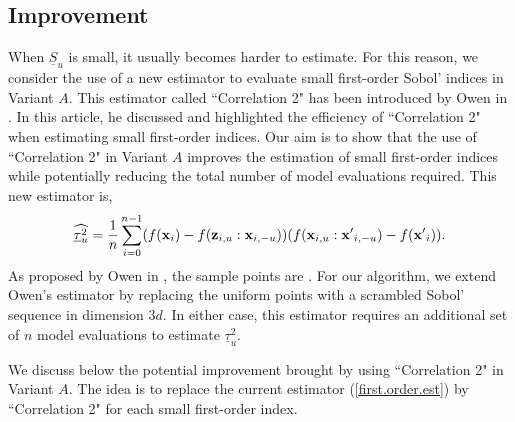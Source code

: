 \subsection{Improvement}
\label{sec:4.2}

When $\underline{S}_u$ is small, it usually becomes harder to estimate. For this reason, we consider the use of a new estimator to evaluate small first-order Sobol' indices in Variant $A$. This estimator called ``Correlation 2" has been introduced by Owen in \cite{Owen}. In this article, he discussed and highlighted the efficiency of ``Correlation 2" when estimating small first-order indices. Our aim is to show that the use of ``Correlation 2" in Variant $A$ improves the estimation of small first-order indices while potentially reducing the total number of model evaluations required. This new estimator is,
\begin{equation*}
\widehat{\underline{\tau}_u^2} = \frac{1}{n} \sum \limits_{i=0}^{n-1} (f(\boldsymbol{\mathbf{x}}_i)-f({\boldsymbol{\mathbf{z}}}_{i,u}:{\boldsymbol{\mathbf{x}}}_{i,-u}))(f(\boldsymbol{\mathbf{x}}_{i,u}:{\boldsymbol{\mathbf{x}}'}_{i,-u})-f({\boldsymbol{\mathbf{x}}'}_i)).
\end{equation*}
As proposed by Owen in \cite{Owen}, the sample points are \break {}. For our algorithm, we extend \break Owen's estimator by replacing the uniform points with a scrambled Sobol' sequence in dimension $3d$. In either case, this estimator requires an additional set of $n$ model evaluations to estimate $\underline{\tau}_u^2$.
\bigskip

We discuss below the potential improvement brought by using ``Correlation 2" in Variant $A$. The idea is to replace the current estimator (\ref{first.order.est}) by  ``Correlation 2" for each small first-order index. 

